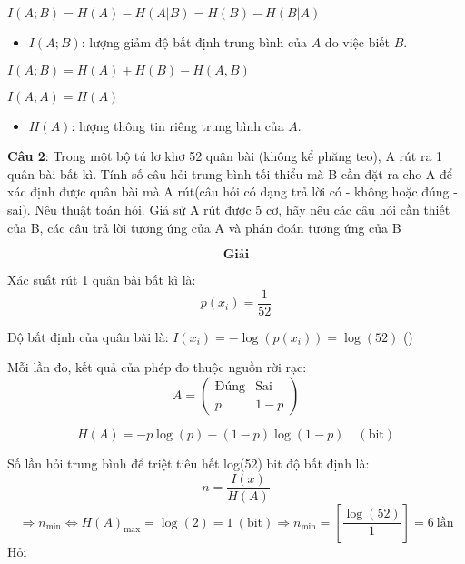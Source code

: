 \documentclass[12pt]{article}
\begin{document}
$
I(A; B) = H(A) - H(A|B) = H(B) - H(B|A)
$

\begin{itemize}
    \item \( I(A; B) \): lượng giảm độ bất định trung bình của \( A \) do việc biết \( B \).
\end{itemize}

$
I(A; B) = H(A) + H(B) - H(A, B)
$

$
I(A; A) = H(A)
$

\begin{itemize}
    \item \( H(A) \): lượng thông tin riêng trung bình của \( A \).
\end{itemize}







\newpage
\textbf{Câu 2}: Trong một bộ tú lơ khơ 52 quân bài (không kể phăng teo), A rút ra 1 quân bài bất kì. Tính số câu hỏi trung bình tối thiểu mà B cần đặt ra cho A để xác định được quân bài mà A rút(câu hỏi có dạng trả lời có - không hoặc đúng - sai). Nêu thuật toán hỏi. Giả sử A rút được 5 cơ, hãy nêu các câu hỏi cần thiết của B, các câu trả lời tương ứng của A và phán đoán tương ứng của B

\[\textbf{Giải}\]

Xác suất rút 1 quân bài bất kì là: \[ p(x_i) = \frac{1}{52} \]

Độ bất định của quân bài là: \( I(x_i) = -\log(p(x_i)) = \log(52) \) ()
    

Mỗi lần đo, kết quả của phép đo thuộc nguồn rời rạc:
\[
A = \begin{pmatrix}
\text{Đúng} & \text{Sai} \\
p & 1 - p
\end{pmatrix}
\]


\[
H(A) = -p \log(p) - (1 - p) \log(1 - p) \quad (\text{bit})
\]

Số lần hỏi trung bình để triệt tiêu hết log(52) bit độ bất định là: 
\[
n = \frac{I(x)}{H(A)}
\]
\[
\Rightarrow n_{\min} \Leftrightarrow H(A)_{\max} = \log(2) = 1 \ (\text{bit})
\Rightarrow n_{\min} = \left[ \frac{\log(52)}{1} \right] = 6 \ \text{lần}
\]
Hỏi
\end{document}
